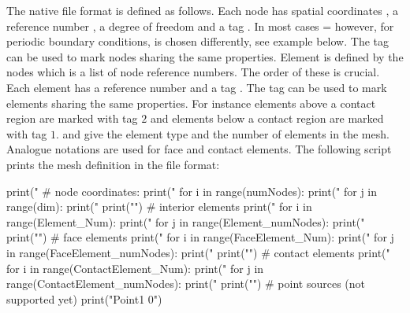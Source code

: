 The native \finley file format is defined as follows.
Each node  has  spatial coordinates , a reference
number , a degree of freedom  and a tag
.
In most cases = however, for periodic
boundary conditions,  is chosen differently, see example below.
The tag can be used to mark nodes sharing the same properties.
Element  is defined by the  nodes
 which is a list of node reference numbers.
The order of these is crucial. Each element has a reference number
 and a tag .
The tag can be used to mark elements sharing the same properties.
For instance elements above a contact region are marked with tag $2$ and
elements below a contact region are marked with tag $1$.
 and  give the element type and the number
of elements in the mesh.
Analogue notations are used for face and contact elements.
The following \PYTHON script prints the mesh definition in the \finley file
format:
\begin{python}
  print("%
  # node coordinates:
  print("%
  for i in range(numNodes):
     print("%
     for j in range(dim): print(" %
     print("\n")
  # interior elements
  print("%
  for i in range(Element_Num):
     print("%
     for j in range(Element_numNodes): print(" %
     print("\n")
  # face elements
  print("%
  for i in range(FaceElement_Num):
     print("%
     for j in range(FaceElement_numNodes): print(" %
     print("\n")
  # contact elements
  print("%
  for i in range(ContactElement_Num):
     print("%
     for j in range(ContactElement_numNodes): print(" %
     print("\n")
  # point sources (not supported yet)
  print("Point1 0")
\end{python}

